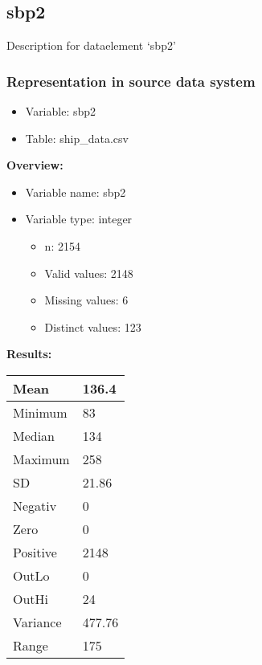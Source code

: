 \documentclass[
]{article}
\providecommand{\tightlist}{%
  \setlength{\itemsep}{0pt}\setlength{\parskip}{0pt}}
\begin{document}
\newpage

\hypertarget{sbp2}{%
\subsection{sbp2}\label{sbp2}}

Description for dataelement `sbp2'

\hypertarget{representation-in-source-data-system-22}{%
\subsubsection{\texorpdfstring{Representation in \textbf{source} data
system}{Representation in source data system}}\label{representation-in-source-data-system-22}}

\begin{itemize}
\tightlist
\item
  Variable: sbp2
\item
  Table: ship\_data.csv
\end{itemize}

\textbf{Overview:}

\begin{itemize}
\tightlist
\item
  Variable name: sbp2
\item
  Variable type: integer

  \begin{itemize}
  \tightlist
  \item
    n: 2154
  \item
    Valid values: 2148
  \item
    Missing values: 6
  \item
    Distinct values: 123
  \end{itemize}
\end{itemize}

\textbf{Results:}\\

\begin{table}[H]
\centering
\begin{tabular}{l|l}
\hline
Mean & 136.4\\
\hline
Minimum & 83\\
\hline
Median & 134\\
\hline
Maximum & 258\\
\hline
SD & 21.86\\
\hline
Negativ & 0\\
\hline
Zero & 0\\
\hline
Positive & 2148\\
\hline
OutLo & 0\\
\hline
OutHi & 24\\
\hline
Variance & 477.76\\
\hline
Range & 175\\
\hline
\end{tabular}
\end{table}
\end{document}
